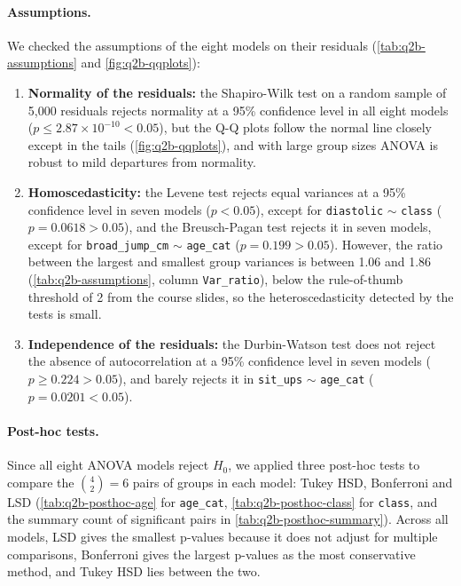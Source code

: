 \paragraph{Assumptions.}
We checked the assumptions of the eight models on their residuals (\autoref{tab:q2b-assumptions} and \autoref{fig:q2b-qqplots}):
\begin{enumerate}
  \item \textbf{Normality of the residuals:} the Shapiro-Wilk test on a random sample of 5,000 residuals rejects normality at a 95\% confidence level in all eight models ($p \leq 2.87 \times 10^{-10} < 0.05$), but the Q-Q plots follow the normal line closely except in the tails (\autoref{fig:q2b-qqplots}), and with large group sizes ANOVA is robust to mild departures from normality.
  \item \textbf{Homoscedasticity:} the Levene test rejects equal variances at a 95\% confidence level in seven models ($p < 0.05$), except for \texttt{diastolic} $\sim$ \texttt{class} ($p = 0.0618 > 0.05$), and the Breusch-Pagan test rejects it in seven models, except for \texttt{broad\_jump\_cm} $\sim$ \texttt{age\_cat} ($p = 0.199 > 0.05$).
    However, the ratio between the largest and smallest group variances is between 1.06 and 1.86 (\autoref{tab:q2b-assumptions}, column \texttt{Var\_ratio}), below the rule-of-thumb threshold of 2 from the course slides, so the heteroscedasticity detected by the tests is small.
  \item \textbf{Independence of the residuals:} the Durbin-Watson test does not reject the absence of autocorrelation at a 95\% confidence level in seven models ($p \geq 0.224 > 0.05$), and barely rejects it in \texttt{sit\_ups} $\sim$ \texttt{age\_cat} ($p = 0.0201 < 0.05$).
\end{enumerate}

\paragraph{Post-hoc tests.}
Since all eight ANOVA models reject $H_0$, we applied three post-hoc tests to compare the $\binom{4}{2} = 6$ pairs of groups in each model: Tukey HSD, Bonferroni and LSD (\autoref{tab:q2b-posthoc-age} for \texttt{age\_cat}, \autoref{tab:q2b-posthoc-class} for \texttt{class}, and the summary count of significant pairs in \autoref{tab:q2b-posthoc-summary}).
Across all models, LSD gives the smallest p-values because it does not adjust for multiple comparisons, Bonferroni gives the largest p-values as the most conservative method, and Tukey HSD lies between the two.

